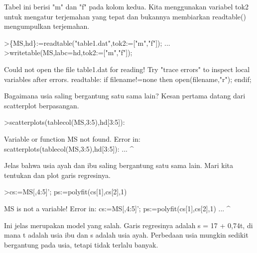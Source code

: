 \documentclass[a4paper,10pt]{article}
\begin{document}
\begin{eulernotebook}
\begin{eulercomment}
Tabel ini berisi "m" dan "f" pada kolom kedua. Kita menggunakan
variabel tok2 untuk mengatur terjemahan yang tepat dan bukannya
membiarkan readtable() mengumpulkan terjemahan.
\end{eulercomment}
\begin{eulerprompt}
>\{MS,hd\}:=readtable("table1.dat",tok2:=["m","f"]);  ...
>writetable(MS,labc=hd,tok2:=["m","f"]);
\end{eulerprompt}
\begin{euleroutput}
  Could not open the file
  table1.dat
  for reading!
  Try "trace errors" to inspect local variables after errors.
  readtable:
      if filename!=none then open(filename,"r"); endif;
\end{euleroutput}
\begin{eulercomment}
Bagaimana usia saling bergantung satu sama lain? Kesan pertama datang
dari scatterplot berpasangan.
\end{eulercomment}
\begin{eulerprompt}
>scatterplots(tablecol(MS,3:5),hd[3:5]):
\end{eulerprompt}
\begin{euleroutput}
  Variable or function MS not found.
  Error in:
  scatterplots(tablecol(MS,3:5),hd[3:5]): ...
                          ^
\end{euleroutput}
\begin{eulercomment}
Jelas bahwa usia ayah dan ibu saling bergantung satu sama lain. Mari
kita tentukan dan plot garis regresinya.
\end{eulercomment}
\begin{eulerprompt}
>cs:=MS[,4:5]'; ps:=polyfit(cs[1],cs[2],1)
\end{eulerprompt}
\begin{euleroutput}
  MS is not a variable!
  Error in:
  cs:=MS[,4:5]'; ps:=polyfit(cs[1],cs[2],1) ...
              ^
\end{euleroutput}
\begin{eulercomment}
Ini jelas merupakan model yang salah. Garis regresinya adalah s = 17 +
0,74t, di mana t adalah usia ibu dan s adalah usia ayah. Perbedaan
usia mungkin sedikit bergantung pada usia, tetapi tidak terlalu
banyak.


\end{eulercomment}
\end{eulernotebook}
\end{document}
